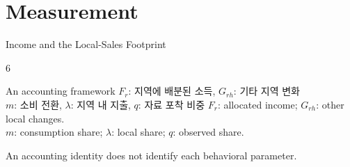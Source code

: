 \documentclass[10pt,aspectratio=169,compress]{beamer}
\begin{document}
\section[Measurement]{Measurement}
\begin{frame}{Income and the Local-Sales Footprint}
  \begin{GridRow}
    \begin{GridCell}{6}
      \begin{block}{An accounting framework}
        \ifABKorean
          $F_r$: 지역에 배분된 소득, $G_{rh}$: 기타 지역 변화\\[2mm]
          $m$: 소비 전환, $\lambda$: 지역 내 지출, $q$: 자료 포착 비중
        \else
          $F_r$: allocated income; $G_{rh}$: other local changes.\\[2mm]
          $m$: consumption share; $\lambda$: local share; $q$: observed share.
        \fi
      \end{block}
    \end{GridCell}
  \end{GridRow}
  \small An accounting identity does not identify each behavioral parameter.
\end{frame}
\end{document}
